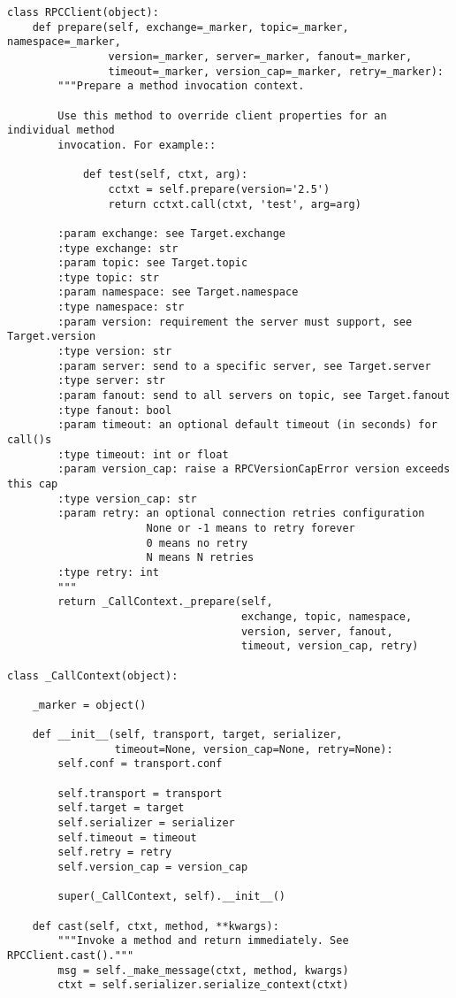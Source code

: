 \documentclass[a4paper,left=2.5cm,right=2.5cm,11pt]{article}
\begin{document}
\begin{lstlisting}
class RPCClient(object):
    def prepare(self, exchange=_marker, topic=_marker, namespace=_marker,
                version=_marker, server=_marker, fanout=_marker,
                timeout=_marker, version_cap=_marker, retry=_marker):
        """Prepare a method invocation context.

        Use this method to override client properties for an individual method
        invocation. For example::

            def test(self, ctxt, arg):
                cctxt = self.prepare(version='2.5')
                return cctxt.call(ctxt, 'test', arg=arg)

        :param exchange: see Target.exchange
        :type exchange: str
        :param topic: see Target.topic
        :type topic: str
        :param namespace: see Target.namespace
        :type namespace: str
        :param version: requirement the server must support, see Target.version
        :type version: str
        :param server: send to a specific server, see Target.server
        :type server: str
        :param fanout: send to all servers on topic, see Target.fanout
        :type fanout: bool
        :param timeout: an optional default timeout (in seconds) for call()s
        :type timeout: int or float
        :param version_cap: raise a RPCVersionCapError version exceeds this cap
        :type version_cap: str
        :param retry: an optional connection retries configuration
                      None or -1 means to retry forever
                      0 means no retry
                      N means N retries
        :type retry: int
        """
        return _CallContext._prepare(self,
                                     exchange, topic, namespace,
                                     version, server, fanout,
                                     timeout, version_cap, retry)

class _CallContext(object):

    _marker = object()

    def __init__(self, transport, target, serializer,
                 timeout=None, version_cap=None, retry=None):
        self.conf = transport.conf

        self.transport = transport
        self.target = target
        self.serializer = serializer
        self.timeout = timeout
        self.retry = retry
        self.version_cap = version_cap

        super(_CallContext, self).__init__()

    def cast(self, ctxt, method, **kwargs):
        """Invoke a method and return immediately. See RPCClient.cast()."""
        msg = self._make_message(ctxt, method, kwargs)
        ctxt = self.serializer.serialize_context(ctxt)


\end{lstlisting}
\end{document}
